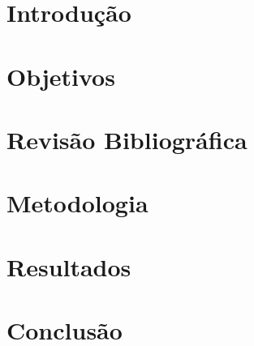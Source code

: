 \documentclass[a4paper]{ifacconf}
\begin{document}
    \section{Introdução}
        
    \section{Objetivos}
        
    \section{Revisão Bibliográfica}
        
    \section{Metodologia}
        
    \section{Resultados}
        
    \section{Conclusão}
        
        
    \appendix
           
\end{document}
